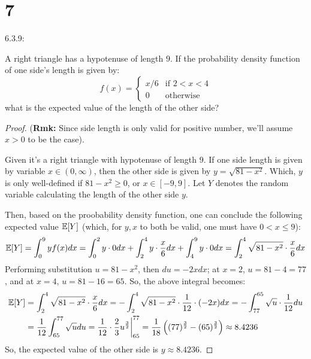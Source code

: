 \documentclass{article}
\begin{document}
\hfil

\section*{7}
\begin{ques}\label{q7}
    6.3.9:

    A right triangle has a hypotenuse of length $9$. If the probability density function of one side's length is given by:
    $$f(x)=\begin{cases}
        x/6 & \text{if } 2<x<4\\
        0 & \text{otherwise}
    \end{cases}$$ 
    what is the expected value of the length of the other side?
\end{ques}

\begin{proof}
    (\textbf{Rmk:} Since side length is only valid for positive number, we'll assume $x>0$ to be the case).


    Given it's a right triangle with hypotenuse of length $9$. If one side length is given by variable $x\in(0,\infty)$, then the other side is given by $y = \sqrt{81-x^2}$. Which, $y$ is only well-defined if $81-x^2\geq 0$, or $x\in [-9,9]$. Let $Y$ denotes the random variable calculating the length of the other side $y$. 
    
    Then, based on the proobability density function, one can conclude the following expected value $\mathbb{E}[Y]$ (which, for $y,x$ to both be valid, one must have $0<x\leq 9$):
    \begin{align}
        \mathbb{E}[Y] = \int_{0}^{9}y f(x)dx = \int_{0}^{2}y \cdot 0 dx + \int_{2}^{4}y \cdot \frac{x}{6}dx + \int_{4}^{9}y\cdot 0 dx= \int_{2}^{4}\sqrt{81-x^2}\cdot\frac{x}{6}dx
    \end{align}
    Performing substitution $u=81-x^2$, then $du = -2x dx$; at $x=2$, $u=81-4 = 77$, and at $x=4$, $u=81-16 = 65$. So, the above integral becomes:
    \begin{align}
        \mathbb{E}[Y] &= \int_{2}^{4}\sqrt{81-x^2}\cdot\frac{x}{6}dx = -\int_{2}^{4}\sqrt{81-x^2}\cdot\frac{1}{12}\cdot (-2x)dx = -\int_{77}^{65}\sqrt{u}\cdot\frac{1}{12}du\\
        &= \frac{1}{12}\int_{65}^{77}\sqrt{u}du = \frac{1}{12}\cdot\frac{2}{3}u^\frac{3}{2}\bigg|_{65}^{77} = \frac{1}{18}\left((77)^\frac{3}{2}-(65)^\frac{3}{2}\right) \approx 8.4236
    \end{align}
    So, the expected value of the other side is $y \approx 8.4236$.
\end{proof}
\end{document}
